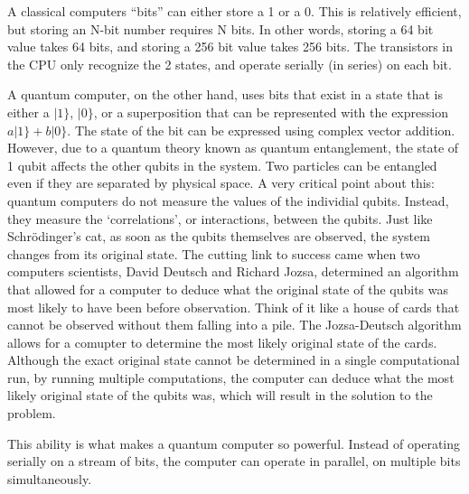 \documentclass[10pt,journal,compsoc]{IEEEtran}
\begin{document}

A classical computers ``bits'' can either store a 1 or a 0. This is relatively efficient, but storing an N-bit number requires N bits. In other words, storing a 64 bit value takes 64 bits, and storing a 256 bit value takes 256 bits. The transistors in the CPU only recognize the 2 states, and operate serially (in series) on each bit. 

A quantum computer, on the other hand, uses bits that exist in a state that is either a $|1\}$, $|0\}$, or a superposition that can be represented with the expression $a|1\} + b|0\}$. The state of the bit can be expressed using complex vector addition. However, due to a quantum theory known as quantum entanglement, the state of 1 qubit affects the other qubits in the system. Two particles can be entangled even if they are separated by physical space. A very critical point about this: quantum computers do not measure the values of the individial qubits. Instead, they measure the `correlations', or interactions, between the qubits. Just like Schr\"{o}dinger's cat, as soon as the qubits themselves are observed, the system changes from its original state. The cutting link to success came when two computers scientists, David Deutsch and Richard Jozsa, determined an algorithm that allowed for a computer to deduce what the original state of the qubits was most likely to have been before observation. Think of it like a house of cards that cannot be observed without them falling into a pile. The Jozsa-Deutsch algorithm allows for a comupter to determine the most likely original state of the cards. Although the exact original state cannot be determined in a single computational run, by running multiple computations, the computer can deduce what the most likely original state of the qubits was, which will result in the solution to the problem.


This ability is what makes a quantum computer so powerful. Instead of operating serially on a stream of bits, the computer can operate in parallel, on multiple bits simultaneously. 
\end{document}
